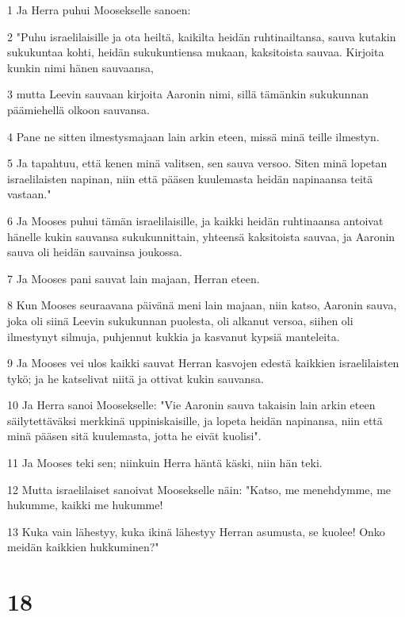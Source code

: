 \par 1 Ja Herra puhui Moosekselle sanoen:
\par 2 "Puhu israelilaisille ja ota heiltä, kaikilta heidän ruhtinailtansa, sauva kutakin sukukuntaa kohti, heidän sukukuntiensa mukaan, kaksitoista sauvaa. Kirjoita kunkin nimi hänen sauvaansa,
\par 3 mutta Leevin sauvaan kirjoita Aaronin nimi, sillä tämänkin sukukunnan päämiehellä olkoon sauvansa.
\par 4 Pane ne sitten ilmestysmajaan lain arkin eteen, missä minä teille ilmestyn.
\par 5 Ja tapahtuu, että kenen minä valitsen, sen sauva versoo. Siten minä lopetan israelilaisten napinan, niin että pääsen kuulemasta heidän napinaansa teitä vastaan."
\par 6 Ja Mooses puhui tämän israelilaisille, ja kaikki heidän ruhtinaansa antoivat hänelle kukin sauvansa sukukunnittain, yhteensä kaksitoista sauvaa, ja Aaronin sauva oli heidän sauvainsa joukossa.
\par 7 Ja Mooses pani sauvat lain majaan, Herran eteen.
\par 8 Kun Mooses seuraavana päivänä meni lain majaan, niin katso, Aaronin sauva, joka oli siinä Leevin sukukunnan puolesta, oli alkanut versoa, siihen oli ilmestynyt silmuja, puhjennut kukkia ja kasvanut kypsiä manteleita.
\par 9 Ja Mooses vei ulos kaikki sauvat Herran kasvojen edestä kaikkien israelilaisten tykö; ja he katselivat niitä ja ottivat kukin sauvansa.
\par 10 Ja Herra sanoi Moosekselle: "Vie Aaronin sauva takaisin lain arkin eteen säilytettäväksi merkkinä uppiniskaisille, ja lopeta heidän napinansa, niin että minä pääsen sitä kuulemasta, jotta he eivät kuolisi".
\par 11 Ja Mooses teki sen; niinkuin Herra häntä käski, niin hän teki.
\par 12 Mutta israelilaiset sanoivat Moosekselle näin: "Katso, me menehdymme, me hukumme, kaikki me hukumme!
\par 13 Kuka vain lähestyy, kuka ikinä lähestyy Herran asumusta, se kuolee! Onko meidän kaikkien hukkuminen?"

\chapter{18}

